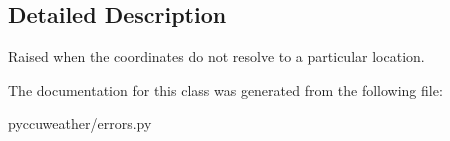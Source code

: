 \subsection{Detailed Description}
\begin{DoxyVerb}Raised when the coordinates do not resolve to a particular location.
\end{DoxyVerb}
 

The documentation for this class was generated from the following file\+:\begin{DoxyCompactItemize}
\item 
pyccuweather/errors.\+py\end{DoxyCompactItemize}
